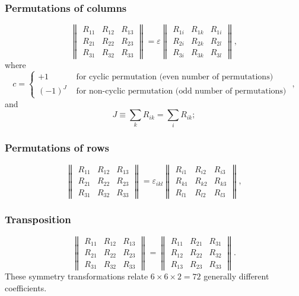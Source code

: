 \subsubsection{Permutations of columns}
\begin{equation}
\begin{Vmatrix}
R_{11} & R_{12} & R_{13}\\
R_{21} & R_{22} & R_{23} \\
R_{31} & R_{32} & R_{33}
\end{Vmatrix}=\varepsilon\begin{Vmatrix}
R_{1 i} & R_{1 k} & R_{1 i} \\
R_{2 i} & R_{2 k} & R_{2 l} \\
R_{3 i} & R_{3 k} & R_{3 l}
\end{Vmatrix},   \label{eq:8:4:1}
\end{equation}
where
\begin{equation}
c= \begin{cases}+1 & \text { for cyclic permutation (even number of permutations) }  \\ (-1)^{J} & \text { for non-cyclic permutation (odd number of permutations) }\end{cases}, \label{eq:8:4:2}
\end{equation}
and
\[
J \equiv \sum_{k} R_{i k}=\sum_{i} R_{i k} ;
\]
\subsubsection{Permutations of rows}
\begin{equation}
\begin{Vmatrix}
R_{11} & R_{12} & R_{13} \\
R_{21} & R_{22} & R_{23} \\
R_{31} & R_{32} & R_{33}
\end{Vmatrix}=\varepsilon_{ikl}\begin{Vmatrix}
R_{i 1} & R_{i 2} & R_{i 3} \\
R_{k 1} & R_{k 2} & R_{k 3} \\
R_{l 1} & R_{l 2} & R_{l 3}
\end{Vmatrix},   \label{eq:8:4:3}
\end{equation}
\subsubsection{Transposition}
\begin{equation}
\begin{Vmatrix}
R_{11} & R_{12} & R_{13} \\
R_{21} & R_{22} & R_{23} \\
R_{31} & R_{32} & R_{33}
\end{Vmatrix}=\begin{Vmatrix}
R_{11} & R_{21} & R_{31} \\
R_{12} & R_{22} & R_{32} \\
R_{13} & R_{23} & R_{33}
\end{Vmatrix}.  \label{eq:8:4:4}
\end{equation}
These symmetry transformations relate $6 \times 6 \times 2=72$ generally different coefficients.

